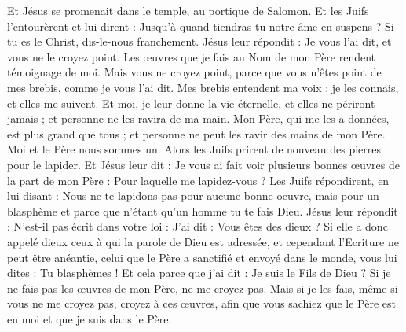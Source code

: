 \begin{multicols}{2}
Et Jésus se promenait dans le temple, au portique de Salomon.
Et les Juifs l'entourèrent et lui dirent : Jusqu'à quand tiendras-tu notre âme en suspens ? Si tu es le Christ, dis-le-nous franchement.
Jésus leur répondit : Je vous l'ai dit, et vous ne le croyez point. Les œuvres que je fais au Nom de mon Père rendent témoignage de moi.
Mais vous ne croyez point, parce que vous n'êtes point de mes brebis, comme je vous l'ai dit.
Mes brebis entendent ma voix ; je les connais, et elles me suivent.
Et moi, je leur donne la vie éternelle, et elles ne périront jamais ; et personne ne les ravira de ma main.
Mon Père, qui me les a données, est plus grand que tous ; et personne ne peut les ravir des mains de mon Père.
Moi et le Père nous sommes un.
Alors les Juifs prirent de nouveau des pierres pour le lapider.
Et Jésus leur dit : Je vous ai fait voir plusieurs bonnes œuvres de la part de mon Père : Pour laquelle me lapidez-vous ?
Les Juifs répondirent, en lui disant : Nous ne te lapidons pas pour aucune bonne oeuvre, mais pour un blasphème et parce que n'étant qu'un homme tu te fais Dieu.
Jésus leur répondit : N'est-il pas écrit dans votre loi : J'ai dit : Vous êtes des dieux ?
Si elle a donc appelé dieux ceux à qui la parole de Dieu est adressée, et cependant l'Ecriture ne peut être anéantie,
celui que le Père a sanctifié et envoyé dans le monde, vous lui dites : Tu blasphèmes ! Et cela parce que j'ai dit : Je suis le Fils de Dieu ?
Si je ne fais pas les œuvres de mon Père, ne me croyez pas.
Mais si je les fais, même si vous ne me croyez pas, croyez à ces œuvres, afin que vous sachiez que le Père est en moi et que je suis dans le Père.

\end{multicols}
